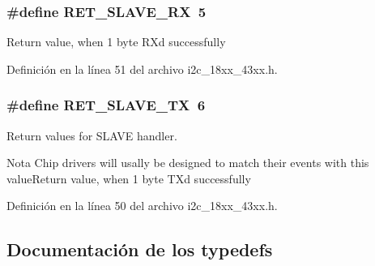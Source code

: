 \subsubsection[{\texorpdfstring{R\+E\+T\+\_\+\+S\+L\+A\+V\+E\+\_\+\+RX}{RET_SLAVE_RX}}]{\setlength{\rightskip}{0pt plus 5cm}\#define R\+E\+T\+\_\+\+S\+L\+A\+V\+E\+\_\+\+RX~5}\hypertarget{group___i2_c__18_x_x__43_x_x_ga16246f0e987c65b12170dd4f127e99f9}{}\label{group___i2_c__18_x_x__43_x_x_ga16246f0e987c65b12170dd4f127e99f9}
Return value, when 1 byte RX\textquotesingle{}d successfully 

Definición en la línea 51 del archivo i2c\+\_\+18xx\+\_\+43xx.\+h.

\subsubsection[{\texorpdfstring{R\+E\+T\+\_\+\+S\+L\+A\+V\+E\+\_\+\+TX}{RET_SLAVE_TX}}]{\setlength{\rightskip}{0pt plus 5cm}\#define R\+E\+T\+\_\+\+S\+L\+A\+V\+E\+\_\+\+TX~6}\hypertarget{group___i2_c__18_x_x__43_x_x_ga49da135773ab760dbf75fcbcdb383623}{}\label{group___i2_c__18_x_x__43_x_x_ga49da135773ab760dbf75fcbcdb383623}


Return values for S\+L\+A\+VE handler. 

\begin{DoxyNote}{Nota}
Chip drivers will usally be designed to match their events with this value\+Return value, when 1 byte TX\textquotesingle{}d successfully 
\end{DoxyNote}


Definición en la línea 50 del archivo i2c\+\_\+18xx\+\_\+43xx.\+h.



\subsection{Documentación de los \textquotesingle{}typedefs\textquotesingle{}}
